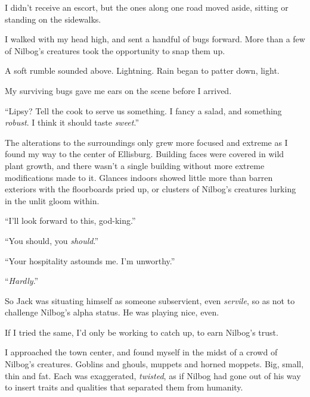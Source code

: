 I didn't receive an escort, but the ones along one road moved aside, sitting or standing on the sidewalks.



I walked with my head high, and sent a handful of bugs forward.  More than a few of Nilbog's creatures took the opportunity to snap them up.



A soft rumble sounded above.  Lightning.  Rain began to patter down, light.



My surviving bugs gave me ears on the scene before I arrived.



``Lipsy?  Tell the cook to serve us something.  I fancy a salad, and something \emph{robust}.  I think it should taste \emph{sweet}.''



The alterations to the surroundings only grew more focused and extreme as I found my way to the center of Ellisburg.  Building faces were covered in wild plant growth, and there wasn't a single building without more extreme modifications made to it.  Glances indoors showed little more than barren exteriors with the floorboards pried up, or clusters of Nilbog's creatures lurking in the unlit gloom within.



``I'll look forward to this, god-king.''



``You should, you \emph{should}.''



``Your hospitality astounds me.  I'm unworthy.''



``\emph{Hardly}.''



So Jack was situating himself as someone subservient, even \emph{servile}, so as not to challenge Nilbog's alpha status.  He was playing nice, even.



If I tried the same, I'd only be working to catch up, to earn Nilbog's trust.



I approached the town center, and found myself in the midst of a crowd of Nilbog's creatures.  Goblins and ghouls, muppets and horned moppets.  Big, small, thin and fat.  Each was exaggerated, \emph{twisted}, as if Nilbog had gone out of his way to insert traits and qualities that separated them from humanity.



